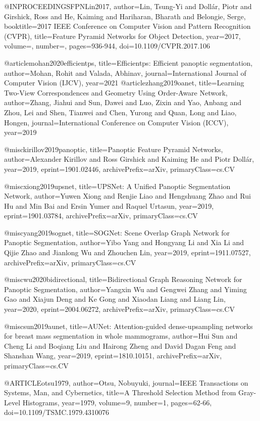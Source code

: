 @INPROCEEDINGS{FPNLin2017,
author={Lin, Tsung-Yi and Dollár, Piotr and Girshick, Ross and He, Kaiming and Hariharan, Bharath and Belongie, Serge},
booktitle={2017 IEEE Conference on Computer Vision and Pattern Recognition (CVPR)},
title={Feature Pyramid Networks for Object Detection},
year={2017},
volume={},
number={},
pages={936-944},
doi={10.1109/CVPR.2017.106}}

@article{mohan2020efficientps,
title={Efficientps: Efficient panoptic segmentation},
author={Mohan, Rohit and Valada, Abhinav},
journal={International Journal of Computer Vision (IJCV)},
year={2021}
}
@article{zhang2019oanet,
title={Learning Two-View Correspondences and Geometry Using Order-Aware Network},
author={Zhang, Jiahui and Sun, Dawei and Luo, Zixin and Yao, Anbang and Zhou, Lei and Shen, Tianwei and Chen, Yurong and Quan, Long and Liao, Hongen},
journal={International Conference on Computer Vision (ICCV)},
year={2019}
}

@misc{kirillov2019panoptic,
title={Panoptic Feature Pyramid Networks},
author={Alexander Kirillov and Ross Girshick and Kaiming He and Piotr Dollár},
year={2019},
eprint={1901.02446},
archivePrefix={arXiv},
primaryClass={cs.CV}
}

@misc{xiong2019upsnet,
title={UPSNet: A Unified Panoptic Segmentation Network},
author={Yuwen Xiong and Renjie Liao and Hengshuang Zhao and Rui Hu and Min Bai and Ersin Yumer and Raquel Urtasun},
year={2019},
eprint={1901.03784},
archivePrefix={arXiv},
primaryClass={cs.CV}
}

@misc{yang2019sognet,
title={SOGNet: Scene Overlap Graph Network for Panoptic Segmentation},
author={Yibo Yang and Hongyang Li and Xia Li and Qijie Zhao and Jianlong Wu and Zhouchen Lin},
year={2019},
eprint={1911.07527},
archivePrefix={arXiv},
primaryClass={cs.CV}
}

@misc{wu2020bidirectional,
title={Bidirectional Graph Reasoning Network for Panoptic Segmentation},
author={Yangxin Wu and Gengwei Zhang and Yiming Gao and Xiajun Deng and Ke Gong and Xiaodan Liang and Liang Lin},
year={2020},
eprint={2004.06272},
archivePrefix={arXiv},
primaryClass={cs.CV}
}

@misc{sun2019aunet,
title={AUNet: Attention-guided dense-upsampling networks for breast mass segmentation in whole mammograms},
author={Hui Sun and Cheng Li and Boqiang Liu and Hairong Zheng and David Dagan Feng and Shanshan Wang},
year={2019},
eprint={1810.10151},
archivePrefix={arXiv},
primaryClass={cs.CV}
}

@ARTICLE{otsu1979,
author={Otsu, Nobuyuki},
journal={IEEE Transactions on Systems, Man, and Cybernetics},
title={A Threshold Selection Method from Gray-Level Histograms},
year={1979},
volume={9},
number={1},
pages={62-66},
doi={10.1109/TSMC.1979.4310076}}


